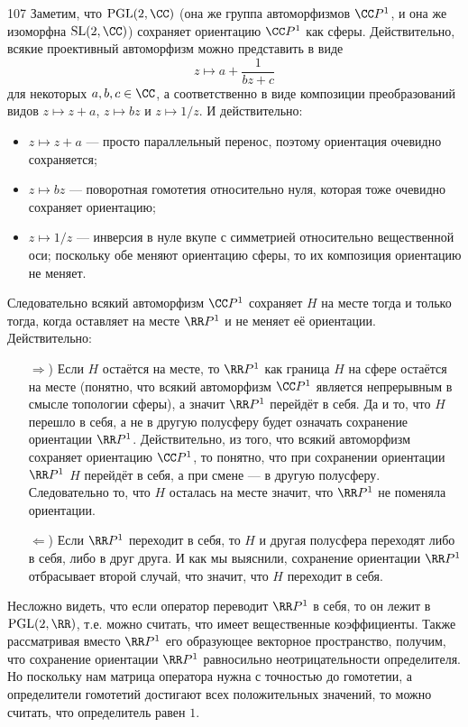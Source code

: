 \documentclass[12pt,a4paper]{article}
\newcommand{\SL}{\ensuremath{\mathrm{SL}}\xspace}
\newcommand{\PGL}{\ensuremath{\mathrm{PGL}}\xspace}
\begin{document}
    \begin{problem}{107}
        Заметим, что $\PGL(2, \CC)$ (она же группа автоморфизмов $\CC P^1$, и она же изоморфна $\SL(2, \CC)$) сохраняет ориентацию $\CC P^1$ как сферы. Действительно, всякие проективный автоморфизм можно представить в виде
        \[z \mapsto a + \frac{1}{bz + c}\]
        для некоторых $a, b, c \in \CC$, а соответственно в виде композиции преобразований видов $z \mapsto z + a$, $z \mapsto bz$ и $z \mapsto 1/z$. И действительно:
        \begin{itemize}
            \item $z \mapsto z + a$ --- просто параллельный перенос, поэтому ориентация очевидно сохраняется;
            \item $z \mapsto bz$ --- поворотная гомотетия относительно нуля, которая тоже очевидно сохраняет ориентацию;
            \item $z \mapsto 1/z$ --- инверсия в нуле вкупе с симметрией относительно вещественной оси; поскольку обе меняют ориентацию сферы, то их композиция ориентацию не меняет.
        \end{itemize}

        Следовательно всякий автоморфизм $\CC P^1$ сохраняет $H$ на месте тогда и только тогда, когда оставляет на месте $\RR P^1$ и не меняет её ориентации. Действительно:
        \begin{itemize}
            \item[$\Rightarrow$)] Если $H$ остаётся на месте, то $\RR P^1$ как граница $H$ на сфере остаётся на месте (понятно, что всякий автоморфизм $\CC P^1$ является непрерывным в смысле топологии сферы), а значит $\RR P^1$ перейдёт в себя. Да и то, что $H$ перешло в себя, а не в другую полусферу будет означать сохранение ориентации $\RR P^1$. Действительно, из того, что всякий автоморфизм сохраняет ориентацию $\CC P^1$, то понятно, что при сохранении ориентации $\RR P^1$ $H$ перейдёт в себя, а при смене --- в другую полусферу. Следовательно то, что $H$ осталась на месте значит, что $\RR P^1$ не поменяла ориентации.

            \item[$\Leftarrow$)] Если $\RR P^1$ переходит в себя, то $H$ и другая полусфера переходят либо в себя, либо в друг друга. И как мы выяснили, сохранение ориентации $\RR P^1$ отбрасывает второй случай, что значит, что $H$ переходит в себя. 
        \end{itemize}

        Несложно видеть, что если оператор переводит $\RR P^1$ в себя, то он лежит в $\PGL(2, \RR)$, т.е. можно считать, что имеет вещественные коэффициенты. Также рассматривая вместо $\RR P^1$ его образующее векторное пространство, получим, что сохранение ориентации $\RR P^1$ равносильно неотрицательности определителя. Но поскольку нам матрица оператора нужна с точностью до гомотетии, а определители гомотетий достигают всех положительных значений, то можно считать, что определитель равен $1$.


\end{problem}
\end{document}
